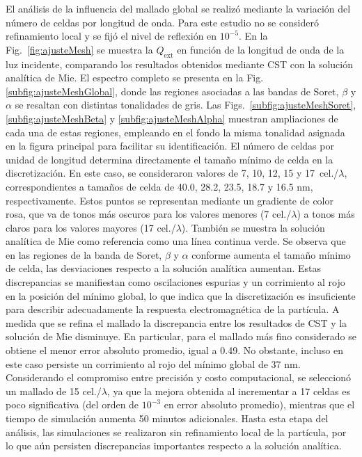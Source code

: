 El análisis de la influencia del mallado global se realizó mediante la variación del número de celdas por longitud de onda. Para este estudio no se consideró refinamiento local y se fijó el nivel de reflexión en $10^{-5}$. En la Fig.~\ref{fig:ajusteMesh} se muestra la $Q_{\text{ext}}$ en función de la longitud de onda de la luz incidente, comparando los resultados obtenidos mediante CST con la solución analítica de Mie. El espectro completo se presenta en la Fig. \ref{subfig:ajusteMeshGlobal}, donde las regiones asociadas a las bandas de Soret, $\beta$ y $\alpha$ se resaltan con distintas tonalidades de gris. Las Figs.~\ref{subfig:ajusteMeshSoret}, \ref{subfig:ajusteMeshBeta} y \ref{subfig:ajusteMeshAlpha} muestran ampliaciones de cada una de estas regiones, empleando en el fondo la misma tonalidad asignada en la figura principal para facilitar su identificación. El número de celdas por unidad de longitud determina directamente el tamaño mínimo de celda en la discretización. En este caso, se consideraron valores de 7, 10, 12, 15 y 17~cel./$\lambda$, correspondientes a tamaños de celda de 40.0, 28.2, 23.5, 18.7 y 16.5 nm, respectivamente. Estos puntos se representan mediante un gradiente de color rosa, que va de tonos más oscuros para los valores menores (7 cel./$\lambda$) a tonos más claros para los valores mayores (17 cel./$\lambda$).  También se muestra la solución analítica de Mie como referencia como una línea continua verde. Se observa que en las regiones de la banda de Soret, $\beta$ y $\alpha$ conforme aumenta el tamaño mínimo de celda, las desviaciones respecto a la solución analítica aumentan. Estas discrepancias se manifiestan como oscilaciones espurias y un corrimiento al rojo en la posición del mínimo global, lo que indica que la discretización es insuficiente para describir adecuadamente la respuesta electromagnética de la partícula. A medida que se refina el mallado la discrepancia entre los resultados de CST y la solución de Mie disminuye. En particular, para el mallado más fino considerado se obtiene el menor error absoluto promedio, igual a 0.49. No obstante, incluso en este caso persiste un corrimiento al rojo del mínimo global de 37 nm. Considerando el compromiso entre precisión y costo computacional, se seleccionó un mallado de 15 cel./$\lambda$, ya que la mejora obtenida al incrementar a 17 celdas es poco significativa (del orden de $10^{-3}$ en error absoluto promedio), mientras que el tiempo de simulación aumenta 50 minutos adicionales. Hasta esta etapa del análisis, las simulaciones se realizaron sin refinamiento local de la partícula, por lo que aún persisten discrepancias importantes respecto a la solución analítica.
